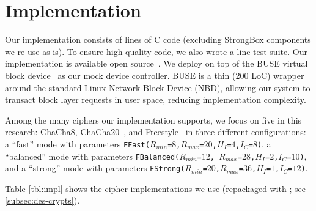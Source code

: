 \section{Implementation}\label{sec:impl}

Our \sys implementation consists of \locTotal lines of C code (excluding
StrongBox components we re-use as is). To ensure high quality code, we also
wrote a \locTest line test suite. Our implementation is available open
source~. We deploy \sys on top of the BUSE virtual block
device~\cite{BUSE} as our mock device controller. BUSE is a thin (200 LoC)
wrapper around the standard Linux Network Block Device (NBD), allowing our
system to transact block layer requests in user space, reducing implementation
complexity.



Among the many ciphers our implementation supports, we focus on five in this
research: ChaCha8, ChaCha20~\cite{ChaCha20}, and Freestyle~\cite{Freestyle} in
three different configurations: a ``fast'' mode with parameters
\texttt{FFast($R_{min}$=$8$,$R_{max}$=$20$,$H_I$=$4$,$I_C$=$8$)}, a ``balanced''
mode with parameters \texttt{FBalanced($R_{min}$=$12$,
$R_{max}$=$28$,$H_I$=$2$,$I_C$=$10$)}, and a ``strong'' mode with parameters
\texttt{FStrong($R_{min}$=$20$,$R_{max}$=$36$,$H_I$=$1$,$I_C$=$12$)}.

Table \cref{tbl:impl} shows the cipher implementations we use (repackaged with
\sysB; see \cref{subsec:des-crypts}).

